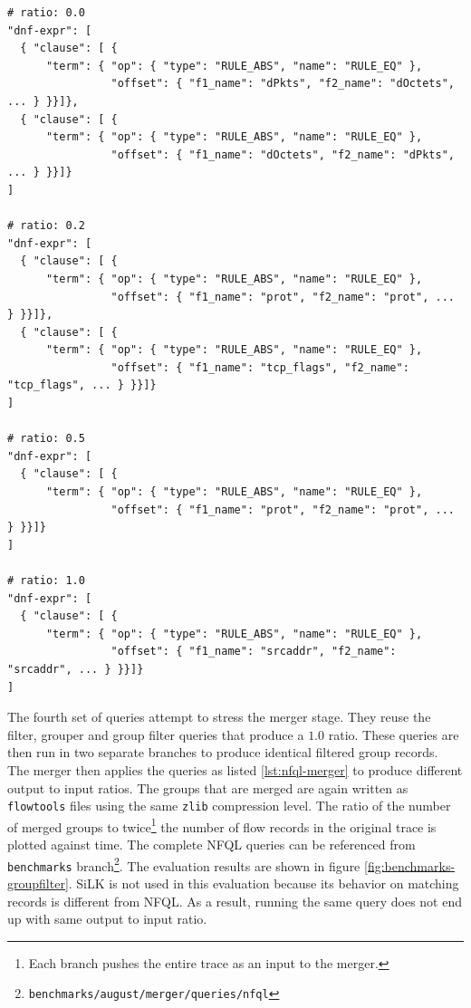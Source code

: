 \begin{lstlisting}
# ratio: 0.0
"dnf-expr": [
  { "clause": [ {
      "term": { "op": { "type": "RULE_ABS", "name": "RULE_EQ" },
                "offset": { "f1_name": "dPkts", "f2_name": "dOctets", ... } }}]},
  { "clause": [ {
      "term": { "op": { "type": "RULE_ABS", "name": "RULE_EQ" },
                "offset": { "f1_name": "dOctets", "f2_name": "dPkts", ... } }}]}
]

# ratio: 0.2
"dnf-expr": [
  { "clause": [ {
      "term": { "op": { "type": "RULE_ABS", "name": "RULE_EQ" },
                "offset": { "f1_name": "prot", "f2_name": "prot", ... } }}]},
  { "clause": [ {
      "term": { "op": { "type": "RULE_ABS", "name": "RULE_EQ" },
                "offset": { "f1_name": "tcp_flags", "f2_name": "tcp_flags", ... } }}]}
]

# ratio: 0.5
"dnf-expr": [
  { "clause": [ {
      "term": { "op": { "type": "RULE_ABS", "name": "RULE_EQ" },
                "offset": { "f1_name": "prot", "f2_name": "prot", ... } }}]}
]

# ratio: 1.0
"dnf-expr": [
  { "clause": [ {
      "term": { "op": { "type": "RULE_ABS", "name": "RULE_EQ" },
                "offset": { "f1_name": "srcaddr", "f2_name": "srcaddr", ... } }}]}
]
\end{lstlisting}

The fourth set of queries attempt to stress the merger stage. They reuse the
filter, grouper and group filter queries that produce a $1.0$ ratio. These
queries are then run in two separate branches to produce identical filtered
group records.  The merger then applies the queries as listed
\ref{lst:nfql-merger} to produce different output to input ratios. The groups
that are merged are again written as \texttt{flowtools} files
 using the same \texttt{zlib} compression
level. The ratio of the number of merged groups to twice\footnote{Each branch
pushes the entire trace as an input to the merger.} the number of flow records
in the original trace is plotted against time.  The complete \ac{NFQL} queries
can be referenced from \texttt{benchmarks}
branch\footnote{\texttt{benchmarks/august/merger/queries/nfql}}.  The
evaluation results are shown in figure \ref{fig:benchmarks-groupfilter}. SiLK
is not used in this evaluation because its behavior on matching records is
different from \ac{NFQL}. As a result, running the same query does not end up
with same output to input ratio.

